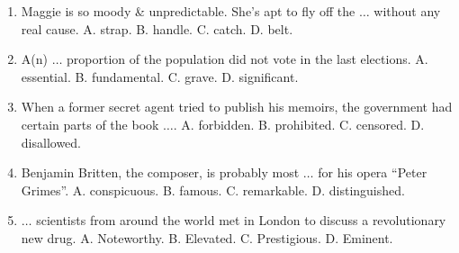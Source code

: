 \documentclass{article}
\numberwithin{equation}{section}
\begin{document}
\begin{enumerate}[leftmargin=2mm]
	\item Maggie is so moody \& unpredictable. She's apt to fly off the $\ldots$ without any real cause. A. strap. B. handle. C. catch. D. belt.
	\item A(n) $\ldots$ proportion of the population did not vote in the last elections. A. essential. B. fundamental. C. grave. D. significant.
	\item When a former secret agent tried to publish his memoirs, the government had certain parts of the book $\ldots$. A. forbidden. B. prohibited. C. censored. D. disallowed.
	\item Benjamin Britten, the composer, is probably most $\ldots$ for his opera ``Peter Grimes''. A. conspicuous. B. famous. C. remarkable. D. distinguished.
	\item $\ldots$ scientists from around the world met in London to discuss a revolutionary new drug. A. Noteworthy. B. Elevated. C. Prestigious. D. Eminent.
\end{enumerate}


\printbibliography[heading=bibintoc]
	
\end{document}
